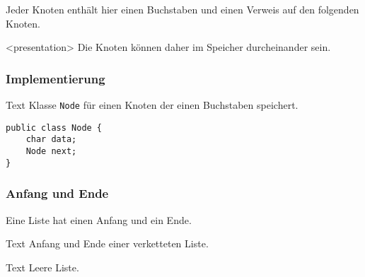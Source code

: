 \begin{multicols}{2}
\begin{frame}[fragile]
\begin{center}
\end{center}

Jeder Knoten enthält hier einen Buchstaben und einen Verweis auf den folgenden Knoten.

\begin{onlyenv}<presentation>
Die Knoten können daher im Speicher durcheinander sein.
\end{onlyenv}

\end{frame}


\begin{frame}[fragile]
\frametitle{Implementierung}

\begin{assignment}{3cm}{Text}
Klasse \lstinline{Node} für einen Knoten der einen Buchstaben speichert.
\end{assignment}
\pause
\begin{vers:beamersolutions}\begin{Loesung}
\pause%
\begin{lstlisting}[emph={Node}]
public class Node {
    char data;
    Node next;
}
\end{lstlisting}
\end{Loesung}\end{vers:beamersolutions}


\end{frame}

\end{multicols}

\pagebreak

\begin{multicols}{2}

\begin{frame}[fragile]
\frametitle<presentation>{Anfang und Ende}
Eine Liste hat einen Anfang und ein Ende.

\begin{assignment}{3cm}{Text}
Anfang und Ende einer verketteten Liste.
\end{assignment}


\begin{assignment}{3cm}{Text}
Leere Liste.
\end{assignment}


\end{frame}


\end{multicols}

